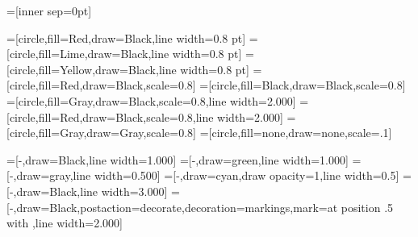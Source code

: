 
\usepackage[svgnames]{xcolor}
\usepackage{tikz}
\usetikzlibrary{decorations.markings}
\usetikzlibrary{shapes.geometric}


=[inner sep=0pt]

=[circle,fill=Red,draw=Black,line width=0.8 pt]
=[circle,fill=Lime,draw=Black,line width=0.8 pt]
=[circle,fill=Yellow,draw=Black,line width=0.8 pt]
=[circle,fill=Red,draw=Black,scale=0.8]
=[circle,fill=Black,draw=Black,scale=0.8]
=[circle,fill=Gray,draw=Black,scale=0.8,line width=2.000]
=[circle,fill=Red,draw=Black,scale=0.8,line width=2.000]
=[circle,fill=Gray,draw=Gray,scale=0.8]
=[circle,fill=none,draw=none,scale=.1]




=[-,draw=Black,line width=1.000]
=[-,draw=green,line width=1.000]
=[-,draw=gray,line width=0.500]
=[-,draw=cyan,draw opacity=1,line width=0.5]
=[-,draw=Black,line width=3.000]
=[-,draw=Black,postaction={decorate},decoration={markings,mark=at position .5 with {\arrow{>}}},line width=2.000]


